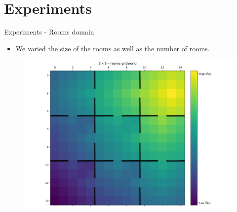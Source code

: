 \documentclass{beamer}
\theoremstyle{mystyle}
\begin{document}
\section{Experiments}
\begin{frame}{Experiments - Rooms domain}


\begin{itemize}
    \item We varied the size of the rooms as well as the number of rooms.
\end{itemize}

\begin{figure}[H]
\centering
\includegraphics[scale=0.25]{Figures/grid_domain_VF.png}

\label{fig:vf_grid}
\end{figure}
    
\end{frame}
\end{document}
